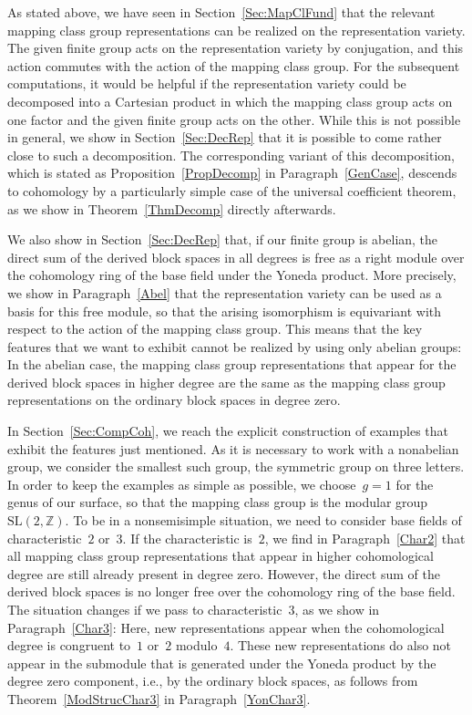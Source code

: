 \documentclass[12pt]{article}
\theoremstyle{definition}
\theoremstyle{break}
\newcommand{\Z}{\mathbb{Z}}
\newcommand{\SL}{\mathrm{SL}}
\renewcommand{\1}{\mathbbm{1}}
\begin{document}
As stated above, we have seen in Section~\ref{Sec:MapClFund} that the relevant mapping class group representations can be realized on the representation variety. The given finite group acts on the representation variety by conjugation, and this action commutes with the action of the mapping class group. For the subsequent computations, it would be helpful if the representation variety could be decomposed into a Cartesian product in which the mapping class group acts on one factor and the given finite group acts on the other. While this is not possible in general, we show in Section~\ref{Sec:DecRep} that it is possible to come rather close to such a decomposition. The corresponding variant of this decomposition, which is stated as Proposition~\ref{PropDecomp} in Paragraph~\ref{GenCase}, descends to cohomology by a particularly simple case of the universal coefficient theorem, as we show in Theorem~\ref{ThmDecomp} directly afterwards.

We also show in Section~\ref{Sec:DecRep} that, if our finite group is abelian, the direct sum of the derived block spaces in all degrees is free as a right module over the cohomology ring of the base field under the Yoneda product. More precisely, we show in Paragraph~\ref{Abel} that the representation variety can be used as a basis for this free module, so that the arising isomorphism is equivariant with respect to the action of the mapping class group. This means that the key features that we want to exhibit cannot be realized by using only abelian groups: In the abelian case, the mapping class group representations that appear for the derived block spaces in higher degree are the same as the mapping class group representations on the ordinary block spaces in degree zero.

In Section~\ref{Sec:CompCoh}, we reach the explicit construction of examples that exhibit the features just mentioned. As it is necessary to work with a nonabelian group, we consider the smallest such group, the symmetric group on three letters. In order to keep the examples as simple as possible, we choose~$g=1$ for the genus of our surface, so that the mapping class group is the modular group~$\SL(2,\Z)$. To be in a nonsemisimple situation, we need to consider base fields of characteristic~$2$ or~$3$. If the characteristic is~$2$, we find in Paragraph~\ref{Char2} that all mapping class group representations that appear in higher cohomological degree are still already present in degree zero. However, the direct sum of the derived block spaces is no longer free over the cohomology ring of the base field. The situation changes if we pass to characteristic~$3$, as we show in Paragraph~\ref{Char3}: Here, new representations appear when the cohomological degree is congruent to~$1$ or~$2$ modulo~$4$. These new representations do also not appear in the submodule that is generated under the Yoneda product by the degree zero component, i.e., by the ordinary block spaces, as follows from Theorem~\ref{ModStrucChar3} in Paragraph~\ref{YonChar3}.
\end{document}
